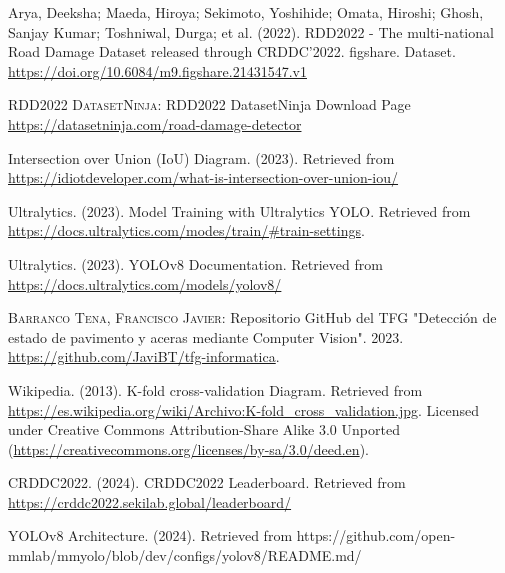 \begin{thebibliography}{10}
        Arya, Deeksha; Maeda, Hiroya; Sekimoto, Yoshihide; Omata, Hiroshi; Ghosh, Sanjay Kumar; Toshniwal, Durga; et al. (2022). RDD2022 - The multi-national Road Damage Dataset released through CRDDC'2022. figshare. Dataset. \url{https://doi.org/10.6084/m9.figshare.21431547.v1}

        \textsc{RDD2022 DatasetNinja}:
        RDD2022 DatasetNinja Download Page
        \url{https://datasetninja.com/road-damage-detector}

        Intersection over Union (IoU) Diagram. (2023). Retrieved from \url{https://idiotdeveloper.com/what-is-intersection-over-union-iou/}

        Ultralytics. (2023). Model Training with Ultralytics YOLO. Retrieved from \url{https://docs.ultralytics.com/modes/train/#train-settings}.

        Ultralytics. (2023). YOLOv8 Documentation. Retrieved from \url{https://docs.ultralytics.com/models/yolov8/}

        \textsc{Barranco Tena, Francisco Javier}:
        Repositorio GitHub del TFG "Detección de estado de pavimento y aceras mediante Computer Vision".
        2023.
        \url{https://github.com/JaviBT/tfg-informatica}.

        Wikipedia. (2013). K-fold cross-validation Diagram.
        Retrieved from  \url{https://es.wikipedia.org/wiki/Archivo:K-fold_cross_validation.jpg}.
        Licensed under Creative Commons Attribution-Share Alike 3.0 Unported (\url{https://creativecommons.org/licenses/by-sa/3.0/deed.en}).
    
        CRDDC2022. (2024). CRDDC2022 Leaderboard. Retrieved from \url{https://crddc2022.sekilab.global/leaderboard/}

        YOLOv8 Architecture. (2024). Retrieved from https://github.com/open-mmlab/mmyolo/blob/dev/configs/yolov8/README.md/

  \end{thebibliography}
  